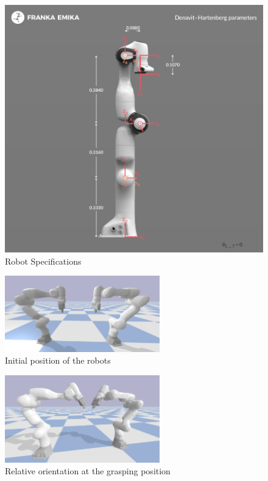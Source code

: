 \documentclass{article}
\begin{document}
\begin{figure}
	\centering
	\includegraphics[width=\textwidth]{dh-diagram.png}
	\caption{\label{fig:robot_spec}Robot Specifications}
\end{figure}
\begin{figure}
	\centering
	\includegraphics[width=0.6\textwidth]{initial_position.png}
	\caption{\label{fig:1}Initial position of the robots}
\end{figure}
\begin{figure}
	\centering
	\includegraphics[width=0.6\textwidth]{grasping_position.png}
	\caption{\label{fig:3}Relative orientation at the grasping position}
\end{figure}
\end{document}
